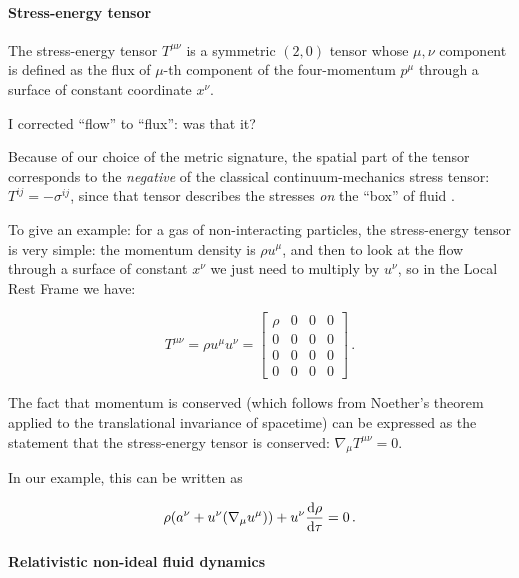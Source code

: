 \documentclass[main.tex]{subfiles}
\begin{document}
\paragraph{Stress-energy tensor} \label{par:stress-energy-tensor}

The stress-energy tensor \(T^{\mu\nu}\) is a symmetric \((2,0)\) tensor whose \(\mu, \nu\) component is defined as the flux of \(\mu\)-th component of the four-momentum \(p^\mu\) through a surface of constant coordinate \(x^\nu\).

\begin{greenbox}
  I corrected ``flow'' to ``flux'': was that it?
\end{greenbox}

Because of our choice of the metric signature, the spatial part of the tensor corresponds to the \emph{negative} of the classical continuum-mechanics stress tensor: \(T^{ij} = - \sigma^{ij}\), since that tensor describes the stresses \emph{on} the ``box'' of fluid \cite[]{Moretti:2016}.

To give an example: for a gas of non-interacting particles, the stress-energy tensor is very simple: the momentum density is \(\rho u^\mu\), and then to look at the flow through a surface of constant \(x^\nu\) we just need to multiply by \(u^\nu\), so in the Local Rest Frame we have:

\begin{equation}
    T^{\mu\nu} = \rho u^\mu u^\nu = \begin{bmatrix}
    \rho    & 0  &  0 & 0 \\
      0 & 0  & 0  & 0 \\
      0 & 0  & 0  & 0 \\
      0 & 0  & 0  & 0
    \end{bmatrix}\,.
\end{equation}

The fact that momentum is conserved (which follows from Noether's theorem applied to the translational invariance of spacetime) can be expressed as the statement that the stress-energy tensor is conserved: \(\nabla_\mu T^{\mu\nu} = 0\).

In our example, this can be written as

\begin{equation}
  \rho (a^\nu + u^\nu (\nabla_\mu u^\mu)) + u^\nu \dv{\rho}{\tau} = 0\,.
\end{equation}

\paragraph{Relativistic non-ideal fluid dynamics}
\end{document}

